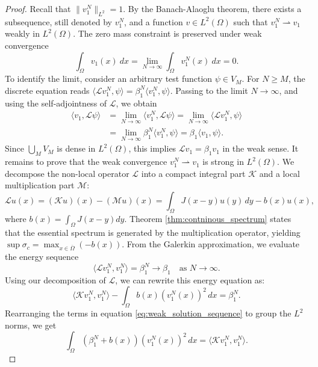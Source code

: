 \documentclass[11pt, a4paper]{article}
\theoremstyle{break}
\theoremstyle{break}
\theoremstyle{break}
\theoremstyle{break}
\theoremstyle{break}
\theoremstyle{break}
\theoremstyle{break}
\theoremstyle{break}
\theoremstyle{break}
\begin{document}
\begin{proof}
    Recall that $\|v_1^N\|_{L^2} = 1$. By the Banach-Alaoglu theorem, there exists a subsequence, still denoted by $v_1^N$, and a function $v \in L^2(\Omega)$ such that $v_1^N \rightharpoonup v_1$ weakly in $L^2(\Omega)$. The zero mass constraint is preserved under weak convergence
    \begin{equation}
        \int_\Omega v_1(x) \:dx = \lim_{N \to \infty} \int_\Omega v_1^N(x) \:dx = 0.
    \end{equation}
    To identify the limit, consider an arbitrary test function $\psi \in V_M$. For $N \geq M$, the discrete equation reads $\langle \mathcal{L} v_1^N, \psi \rangle = \beta_1^N \langle v_1^N, \psi \rangle$. Passing to the limit $N \to \infty$, and using the self-adjointness of $\mathcal{L}$, we obtain
    \begin{align}
        \langle v_1, \mathcal{L} \psi \rangle &= \lim_{N \to \infty} \langle v_1^N, \mathcal{L} \psi \rangle = \lim_{N \to \infty} \langle \mathcal{L} v_1^N, \psi \rangle \\
        &= \lim_{N \to \infty} \beta_1^N \langle v_1^N, \psi \rangle = \beta_1 \langle v_1, \psi \rangle.
    \end{align}
    Since $\bigcup_{M} V_M$ is dense in $L^2(\Omega)$, this implies $\mathcal{L} v_1 = \beta_1 v_1$ in the weak sense. It remains to prove that the weak convergence $v_1^N \rightharpoonup v_1$ is strong in $L^2(\Omega)$. We decompose the non-local operator $\mathcal{L}$ into a compact integral part $\mathcal{K}$ and a local multiplication part $\mathcal{M}$:
    \begin{equation}
        \mathcal{L}u(x) = (\mathcal{K}u)(x) - (\mathcal{M}u)(x) = \int_\Omega J(x-y)u(y)\,dy - b(x)u(x),
    \end{equation}
    where $b(x) = \int_\Omega J(x-y)dy$. Theorem \ref{thm:contninous_spectrum} states that the essential spectrum is generated by the multiplication operator, yielding $\sup \sigma_c = \max_{x \in \overline{\Omega}} (-b(x))$. From the Galerkin approximation, we evaluate the energy sequence
    \begin{equation}
        \langle \mathcal{L} v_1^N, v_1^N \rangle = \beta_1^N \to \beta_1 \quad \text{as } N \to \infty.
    \end{equation}
    Using our decomposition of $\mathcal{L}$, we can rewrite this energy equation as:
    \begin{equation}
        \label{eq:weak_solution_sequence}
        \langle \mathcal{K} v_1^N, v_1^N \rangle - \int_\Omega b(x) (v_1^N(x))^2 \, dx = \beta_1^N.
    \end{equation}
    Rearranging the terms in equation \eqref{eq:weak_solution_sequence} to group the $L^2$ norms, we get
    \begin{equation} \label{eq:rearranged_energy}
        \int_\Omega (\beta_1^N + b(x)) (v_1^N(x))^2 \, dx = \langle \mathcal{K} v_1^N, v_1^N \rangle.
    \end{equation}
    

\end{proof}
\end{document}
